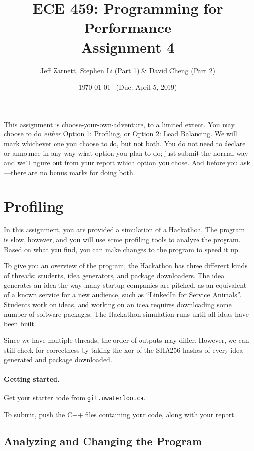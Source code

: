 \documentclass[letterpaper,10pt]{article}
\title{\bf ECE 459: Programming for Performance\\Assignment 4}
\author{Jeff Zarnett, Stephen Li (Part 1) \& David Cheng (Part 2)}
\date{\today ~ (Due: April 5, 2019)}
\begin{document}
\maketitle

This assignment is choose-your-own-adventure, to a limited extent. You may choose to do \textit{either} Option 1: Profiling, or Option 2: Load Balancing. We will mark whichever one you choose to do, but not both. You do not need to declare or announce in any way what option you plan to do; just submit the normal way and we'll figure out from your report which option you chose. And before you ask---there are no bonus marks for doing both. 


\section{Profiling}

In this assignment, you are provided a simulation of a Hackathon. The program is slow, however, and you will use some profiling tools to analyze the program. Based on what you find, you can make changes to the program to speed it up. 

To give you an overview of the program, the Hackathon has three different kinds of threads: students, idea generators, and package downloaders. The idea generates an idea the way many startup companies are pitched, as an equivalent of a known service for a new audience, such as ``LinkedIn for Service Animals''. Students work on ideas, and working on an idea requires downloading some number of software packages. The Hackathon simulation runs until all ideas have been built.

Since we have multiple threads, the order of outputs may differ. However, we can still check for correctness by taking the xor of the SHA256 hashes of every idea generated and package downloaded.

\paragraph{Getting started.} Get your starter code from \texttt{git.uwaterloo.ca}.

To submit, push the C++ files containing your code, along with your report.

\subsection{Analyzing and Changing the Program}
\end{document}
